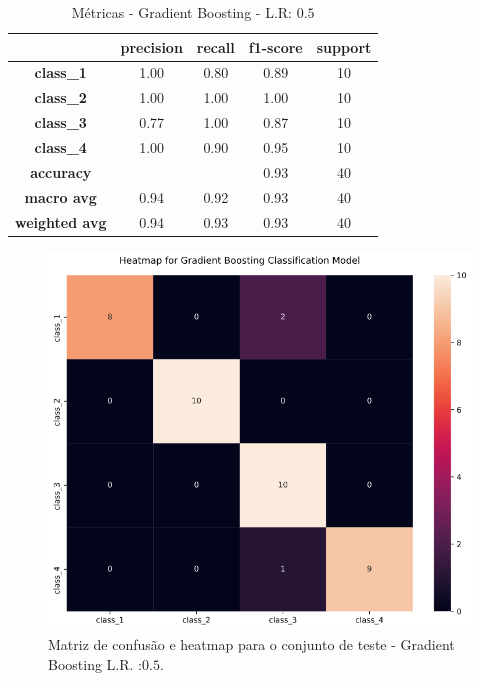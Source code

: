\documentclass[
	article,			%
	11pt,				%
	oneside,			%
	a4paper,			%
	english,			%
	brazil,				%
	sumario=tradicional
	]{abntex2}
\begin{document}
\newpage
\begin{table}[H]
\centering
\begin{tabular}{c|c|c|c|c|}
\cline{2-5}
                                            & \textbf{precision} & \textbf{recall} & \textbf{f1-score} & \textbf{support} \\ \hline
\multicolumn{1}{|c|}{\textbf{class\_1}}     & 1.00               & 0.80            & 0.89              & 10               \\ \hline
\multicolumn{1}{|c|}{\textbf{class\_2}}     & 1.00               & 1.00            & 1.00              & 10               \\ \hline
\multicolumn{1}{|c|}{\textbf{class\_3}}     & 0.77               & 1.00            & 0.87              & 10               \\ \hline
\multicolumn{1}{|c|}{\textbf{class\_4}}     & 1.00               & 0.90            & 0.95              & 10               \\ \hline
\multicolumn{1}{|c|}{\textbf{accuracy}}     &                    &                 & 0.93              & 40               \\ \hline
\multicolumn{1}{|c|}{\textbf{macro avg}}    & 0.94               & 0.92            & 0.93              & 40               \\ \hline
\multicolumn{1}{|c|}{\textbf{weighted avg}} & 0.94               & 0.93            & 0.93              & 40               \\ \hline
\end{tabular}
\caption{Métricas - Gradient Boosting - L.R: $0.5$}
\label{tab:gb_01}
\end{table}


\begin{figure}[H]
 \centering
 \includegraphics[scale=0.5]{fig/gb_cm.png}
 \caption{Matriz de confusão e heatmap para o conjunto de teste - Gradient Boosting L.R. :$0.5$.}
 \label{fig:gb_cm}
\end{figure}
\end{document}
